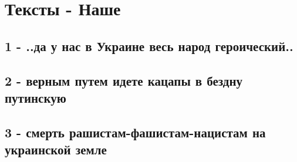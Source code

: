  
 
 
 
 
\section{Тексты - Наше}

\subsection{1 - ..да у нас в Украине весь народ героический..}

\subsection{2 - верным путем идете кацапы в бездну путинскую}

\subsection{3 - смерть рашистам-фашистам-нацистам на украинской земле}



